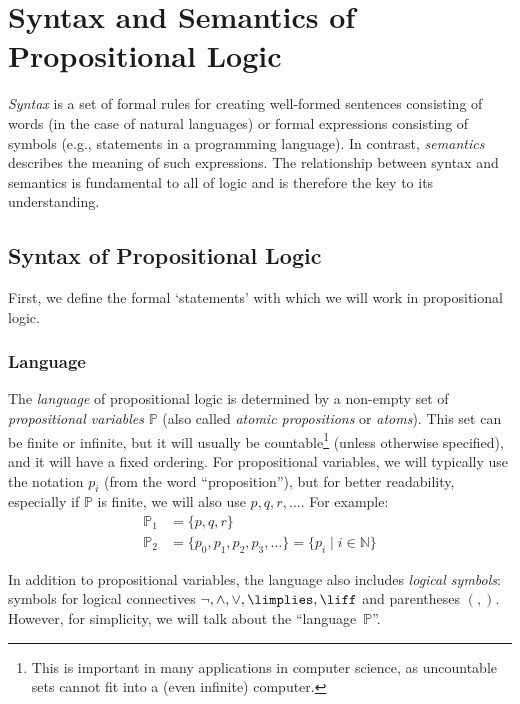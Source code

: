 \chapter{Syntax and Semantics of Propositional Logic}

\emph{Syntax} is a set of formal rules for creating well-formed sentences consisting of words (in the case of natural languages) or formal expressions consisting of symbols (e.g., statements in a programming language). In contrast, \emph{semantics} describes the meaning of such expressions. The relationship between syntax and semantics is fundamental to all of logic and is therefore the key to its understanding.

\section{Syntax of Propositional Logic}

First, we define the formal `statements' with which we will work in propositional logic.

\subsection{Language}

The \emph{language} of propositional logic is determined by a non-empty set of \emph{propositional variables} \( \mathbb P \) (also called \emph{atomic propositions} or \emph{atoms}). This set can be finite or infinite, but it will usually be countable\footnote{This is important in many applications in computer science, as uncountable sets cannot fit into a (even infinite) computer.} (unless otherwise specified), and it will have a fixed ordering. For propositional variables, we will typically use the notation \( p_i \) (from the word ``proposition''), but for better readability, especially if \( \mathbb P \) is finite, we will also use \( p, q, r, \dots \). For example:
\begin{align*}
    \mathbb P_1 &= \{ p, q, r \} \\
    \mathbb P_2 &= \{ p_0, p_1, p_2, p_3, \ldots \} = \{ p_i \mid i \in \mathbb{N} \}
\end{align*}

In addition to propositional variables, the language also includes \emph{logical symbols}: symbols for logical connectives \( \neg, \land, \lor, \limplies, \liff \) and parentheses \( (, ) \). However, for simplicity, we will talk about the ``language~\( \mathbb P \)''.

